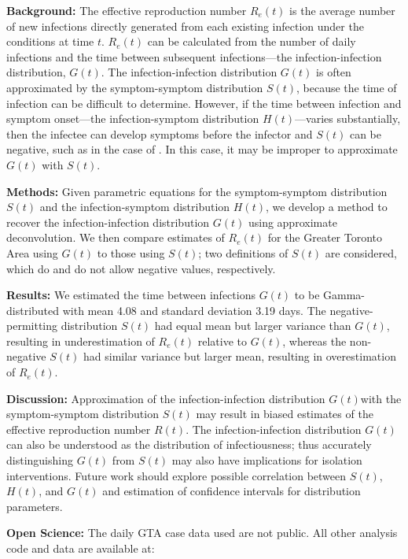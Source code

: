 \par\textbf{Background:}
The effective reproduction number $R_e(t)$ is the average number of new infections directly generated from each existing infection under the conditions at time $t$.
$R_e(t)$ can be calculated from the number of daily infections
and the time between subsequent infections---the infection-infection distribution, $G(t)$.
The infection-infection distribution $G(t)$ is often approximated by the symptom-symptom distribution $S(t)$,
because the time of infection can be difficult to determine.
However, if the time between infection and symptom onset---the infection-symptom distribution $H(t)$---varies substantially,
then the infectee can develop symptoms before the infector and $S(t)$ can be negative, such as in the case of \covid.
In this case, it may be improper to approximate $G(t)$ with $S(t)$.
\par\textbf{Methods:}
Given parametric equations for the symptom-symptom distribution $S(t)$ and the infection-symptom distribution $H(t)$,
we develop a method to recover the infection-infection distribution $G(t)$ using approximate deconvolution.
We then compare estimates of $R_e(t)$ for the Greater Toronto Area using $G(t)$ to those using $S(t)$;
two definitions of $S(t)$ are considered, which do and do not allow negative values, respectively.
\par\textbf{Results:}
We estimated the time between \covid infections $G(t)$ to be Gamma-distributed with mean 4.08 and standard deviation 3.19 days.
The negative-permitting distribution $S(t)$ had equal mean but larger variance than $G(t)$, resulting in underestimation of $R_e(t)$ relative to $G(t)$,
whereas the non-negative $S(t)$ had similar variance but larger mean, resulting in overestimation of $R_e(t)$.
\par\textbf{Discussion:}
Approximation of the infection-infection distribution $G(t) $with the symptom-symptom distribution $S(t)$
may result in biased estimates of the effective reproduction number $R(t)$.
The infection-infection distribution $G(t)$ can also be understood as the distribution of infectiousness;
thus accurately distinguishing $G(t)$ from $S(t)$ may also have implications for isolation interventions.
Future work should explore possible correlation between $S(t)$, $H(t)$, and $G(t)$ and
estimation of confidence intervals for distribution parameters.
\par\textbf{Open Science:}
The daily GTA case data used are not public.
All other analysis code and data are available at:\\